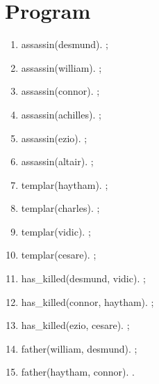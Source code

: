 \documentclass[11pt,a4paper,BCOR12mm, headexclude, footexclude, twoside, openright]{scrartcl}
\numberwithin{equation}{section} %
\numberwithin{figure}{section} %
\numberwithin{table}{section} %
\begin{document}
\section{Program}
\label{acpp}
\begin{enumerate}
\item        assassin(desmund). ;
\item        assassin(william). ;
\item        assassin(connor). ;
\item        assassin(achilles). ;
\item        assassin(ezio). ;
\item        assassin(altair). ;
\item        templar(haytham). ;
\item        templar(charles). ;
\item        templar(vidic). ;
\item       templar(cesare). ;
\item       has\_killed(desmund, vidic). ;
\item       has\_killed(connor, haytham). ;
\item       has\_killed(ezio, cesare). ;
\item       father(william, desmund). ;
\item       father(haytham, connor). .
\end{enumerate}




\end{document}
